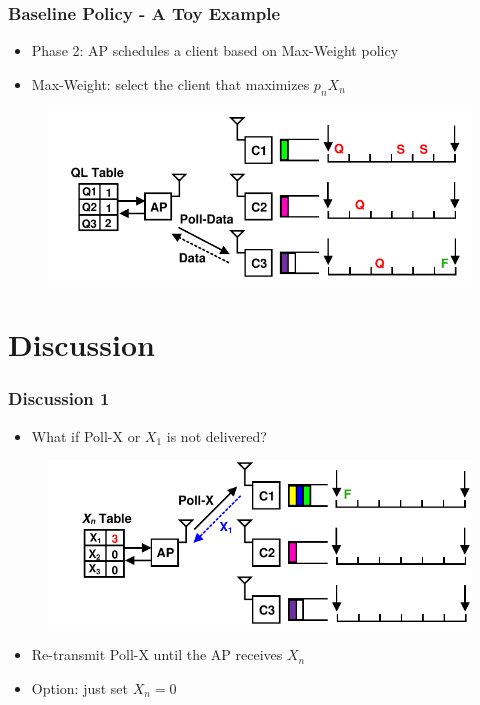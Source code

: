 \documentclass{beamer}
\begin{document}
\begin{frame}
\frametitle{Baseline Policy - A Toy Example}
\begin{itemize}
\item Phase 2: AP schedules a client based on Max-Weight policy
\item Max-Weight: select the client that maximizes $p_nX_n$
\end{itemize}
\begin{figure}
\centering
\includegraphics[scale=0.8]{animation_06.pdf}
\end{figure}
\end{frame}

\section{Discussion}

\begin{frame}
\frametitle{Discussion 1}
\begin{itemize}
\item What if Poll-X or $X_1$ is not delivered?
\end{itemize}
\begin{figure}
\centering
\includegraphics[scale=0.8]{discussion_1.pdf}
\end{figure}
\begin{itemize}
\pause
\item Re-transmit Poll-X until the AP receives $X_n$
\item Option: just set $X_n=0$
\end{itemize}
\end{frame}
\end{document}
